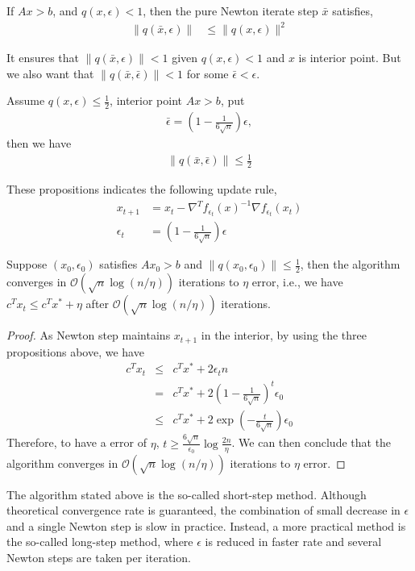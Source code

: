 \begin{proposition}\label{prop2}
If $Ax>b$, and $q(x,\epsilon)<1$, then the pure Newton iterate
step $\bar{x}$ satisfies,
\begin{align}
\|q(\bar{x}, \epsilon)\| &\leq \|q(x, \epsilon)\|^2 
\end{align}
\end{proposition}
It ensures that $\|q(\bar{x}, {\epsilon})\|<1$ given $q(x,\epsilon)<1$ and $x$ is interior point. But we also want that $\|q(\bar{x}, \bar{\epsilon})\|<1$ for some $\bar{\epsilon}<\epsilon$. 

\begin{proposition}\label{prop3}
Assume $q(x,\epsilon)\leq \frac{1}{2}$, interior point $Ax>b$,
put 
\begin{align}
\bar{\epsilon} = (1-\frac{1}{6\sqrt{n}})\epsilon,
\end{align}
then we have
\begin{align}
\|q(\bar{x}, \bar{\epsilon})\|\leq \frac{1}{2}
\end{align}
\end{proposition}
These propositions indicates the following update rule,
\begin{align}
x_{t+1} & = x_t - \nabla^Tf_{\epsilon_t}(x)^{-1}\nabla f_{\epsilon_t}(x_t) \\
\epsilon_t & = (1-\frac{1}{6\sqrt{n}})\epsilon
\end{align}
\begin{theorem}
Suppose $(x_0, \epsilon_0)$ satisfies $Ax_0 >b$ and 
$\|q(x_0,\epsilon_0)\|\leq\frac{1}{2}$, then the algorithm
converges in $\mathcal{O}(\sqrt{n}\log(n/\eta))$ iterations to $\eta$ error, i.e., we have $c^Tx_t\leqslant{c^Tx^*+\eta}$ after $\mathcal{O}(\sqrt{n}\log(n/\eta))$ iterations.
\end{theorem}

\begin{proof}
As Newton step maintains $x_{t+1}$ in the interior, by using the three propositions above, we have 
\begin{eqnarray}
c^Tx_t&\leqslant&{c^Tx^*+2\epsilon_t{n}}\nonumber\\
&=&{c^Tx^*+2(1-\frac{1}{6\sqrt{n}})^t\epsilon_0}\nonumber\\
&\leqslant&{c^Tx^*+2\exp(-\frac{t}{6\sqrt{n}})\epsilon_0}
\end{eqnarray}
Therefore, to have a error of $\eta$, $t\geqslant{\frac{6\sqrt{n}}{\epsilon_0}}\log{\frac{2n}{\eta}}$. We can then conclude that the algorithm converges in  $\mathcal{O}(\sqrt{n}\log(n/\eta))$ iterations to $\eta$ error. 
\end{proof}

The algorithm stated above is the so-called short-step method. Although theoretical convergence rate is guaranteed, the combination of small decrease in $\epsilon$ and a single Newton step is slow in practice. Instead, a more practical method is the so-called long-step method, where $\epsilon$ is reduced in faster rate and several Newton steps are taken per iteration.
